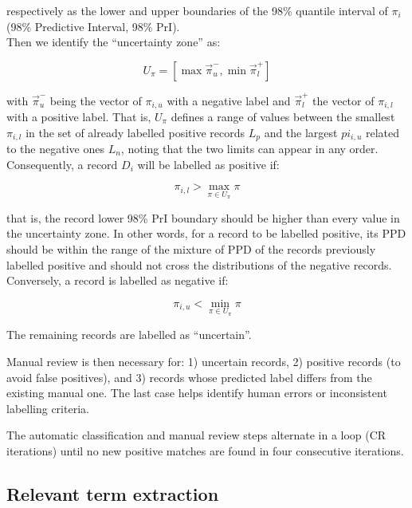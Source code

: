\documentclass[]{bmcart}
\begin{document}
respectively as the lower and upper boundaries of the 98\% quantile
interval of \(\pi_i\) (98\% Predictive Interval, 98\% PrI).\\
Then we identify the ``uncertainty zone'' as:

\[U_\pi=[\max\vec{\pi}_{u}^-, \min\vec{\pi}_{l}^+] \tag{Eq. 3}\]

with \(\vec{\pi}_{u}^-\) being the vector of \(\pi_{i,u}\) with a
negative label and \(\vec{\pi}_{l}^+\) the vector of \(\pi_{i,l}\) with
a positive label. That is, \(U_\pi\) defines a range of values between
the smallest \(\pi_{i,l}\) in the set of already labelled positive
records \(L_p\) and the largest \(pi_{i,u}\) related to the negative
ones \(L_n\), noting that the two limits can appear in any order.\\
Consequently, a record \(D_i\) will be labelled as positive if:

\[\pi_{i,l} > \max_{\pi \in U_\pi} \pi \tag{Eq. 4}\]

that is, the record lower 98\% PrI boundary should be higher than every
value in the uncertainty zone. In other words, for a record to be
labelled positive, its PPD should be within the range of the mixture of
PPD of the records previously labelled positive and should not cross the
distributions of the negative records.\\
Conversely, a record is labelled as negative if:

\[\pi_{i,u} < \min_{\pi \in U_\pi} \pi \tag{Eq. 5}\]

The remaining records are labelled as ``uncertain''.

Manual review is then necessary for: 1) uncertain records, 2) positive
records (to avoid false positives), and 3) records whose predicted label
differs from the existing manual one. The last case helps identify human
errors or inconsistent labelling criteria.

The automatic classification and manual review steps alternate in a loop
(CR iterations) until no new positive matches are found in four
consecutive iterations.

\subsection*{Relevant term extraction}
\end{document}
